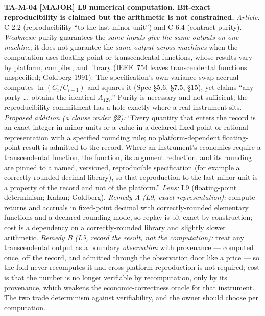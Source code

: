 \documentclass[11pt,a4paper]{article}
\newcommand{\sev}[1]{\textbf{[#1]}}
\newcommand{\lens}[1]{\textnormal{#1}}
\newcommand{\finding}[1]{\medskip\noindent\textbf{#1}}
\begin{document}
\finding{TA-M-04 \sev{MAJOR} \lens{L9 numerical computation}. Bit-exact reproducibility is
claimed but the arithmetic is not constrained.}
\emph{Article:} C-2.2 (reproducibility ``to the last minor unit'') and C-6.4 (contract purity).
\emph{Weakness:} purity guarantees the \emph{same inputs give the same outputs on one machine};
it does not guarantee the \emph{same output across machines} when the computation uses floating
point or transcendental functions, whose results vary by platform, compiler, and library
(IEEE~754 leaves transcendental functions unspecified; Goldberg 1991). The specification's own
variance-swap accrual computes $\ln(C_i/C_{i-1})$ and squares it (Spec §5.6, §7.5, §15), yet
claims ``any party \dots\ obtains the identical $A_{127}$.'' Purity is necessary and not
sufficient; the reproducibility commitment has a hole exactly where a real instrument sits.
\emph{Proposed addition (a clause under §2):} ``Every quantity that enters the record is an
exact integer in minor units or a value in a declared fixed-point or rational representation
with a specified rounding rule; no platform-dependent floating-point result is admitted to the
record. Where an instrument's economics require a transcendental function, the function, its
argument reduction, and its rounding are pinned to a named, versioned, reproducible
specification (for example a correctly-rounded decimal library), so that reproduction to the
last minor unit is a property of the record and not of the platform.'' \emph{Lens:} L9
(floating-point determinism; Kahan; Goldberg). \emph{Remedy A (L9, exact representation):}
compute returns and accruals in fixed-point decimal with correctly-rounded elementary functions
and a declared rounding mode, so replay is bit-exact by construction; cost is a dependency on a
correctly-rounded library and slightly slower arithmetic. \emph{Remedy B (L5, record the result,
not the computation):} treat any transcendental output as a boundary \emph{observation} with
provenance --- computed once, off the record, and admitted through the observation door like a
price --- so the fold never recomputes it and cross-platform reproduction is not required; cost
is that the number is no longer verifiable by recomputation, only by its provenance, which
weakens the economic-correctness oracle for that instrument. The two trade determinism against
verifiability, and the owner should choose per computation.
\end{document}
